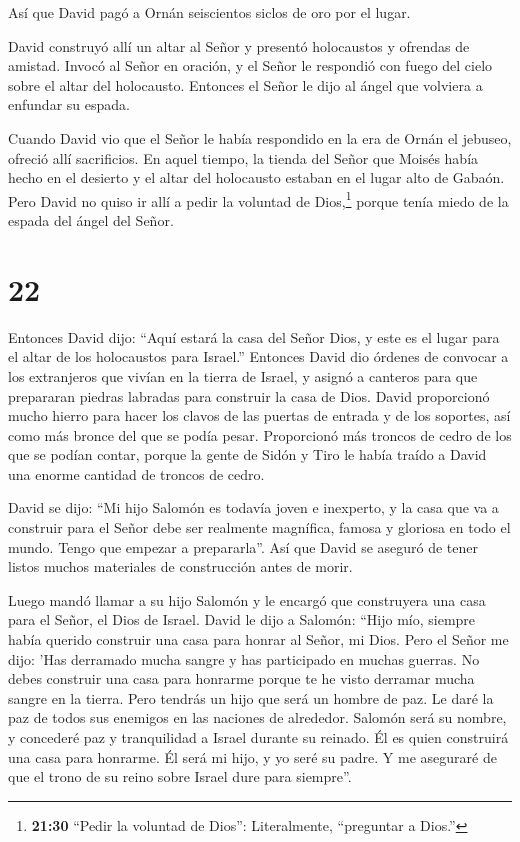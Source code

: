  Así que David pagó a Ornán seiscientos siclos de oro por
el lugar.

 David construyó allí un altar al Señor y presentó
holocaustos y ofrendas de amistad. Invocó al Señor en oración, y el
Señor le respondió con fuego del cielo sobre el altar del holocausto.
 Entonces el Señor le dijo al ángel que volviera a enfundar
su espada.

 Cuando David vio que el Señor le había respondido en la
era de Ornán el jebuseo, ofreció allí sacrificios.  En
aquel tiempo, la tienda del Señor que Moisés había hecho en el desierto
y el altar del holocausto estaban en el lugar alto de Gabaón.
 Pero David no quiso ir allí a pedir la voluntad de
Dios,\footnote{\textbf{21:30} ``Pedir la voluntad de Dios'':
  Literalmente, ``preguntar a Dios.''} porque tenía miedo de la espada
del ángel del Señor.

\hypertarget{section-21}{%
\section{22}\label{section-21}}

 Entonces David dijo: ``Aquí estará la casa del Señor Dios,
y este es el lugar para el altar de los holocaustos para Israel.''
 Entonces David dio órdenes de convocar a los extranjeros
que vivían en la tierra de Israel, y asignó a canteros para que
prepararan piedras labradas para construir la casa de Dios. 
David proporcionó mucho hierro para hacer los clavos de las puertas de
entrada y de los soportes, así como más bronce del que se podía pesar.
 Proporcionó más troncos de cedro de los que se podían
contar, porque la gente de Sidón y Tiro le había traído a David una
enorme cantidad de troncos de cedro.

 David se dijo: ``Mi hijo Salomón es todavía joven e
inexperto, y la casa que va a construir para el Señor debe ser realmente
magnífica, famosa y gloriosa en todo el mundo. Tengo que empezar a
prepararla''. Así que David se aseguró de tener listos muchos materiales
de construcción antes de morir.

 Luego mandó llamar a su hijo Salomón y le encargó que
construyera una casa para el Señor, el Dios de Israel. 
David le dijo a Salomón: ``Hijo mío, siempre había querido construir una
casa para honrar al Señor, mi Dios.  Pero el Señor me dijo:
'Has derramado mucha sangre y has participado en muchas guerras. No
debes construir una casa para honrarme porque te he visto derramar mucha
sangre en la tierra.  Pero tendrás un hijo que será un
hombre de paz. Le daré la paz de todos sus enemigos en las naciones de
alrededor. Salomón será su nombre, y concederé paz y tranquilidad a
Israel durante su reinado.  Él es quien construirá una casa
para honrarme. Él será mi hijo, y yo seré su padre. Y me aseguraré de
que el trono de su reino sobre Israel dure para siempre''.

